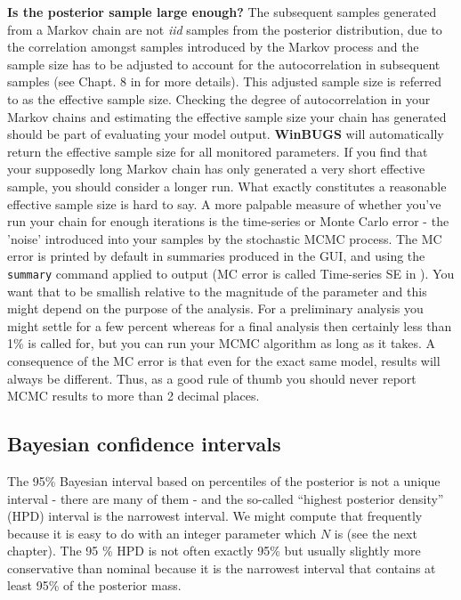 {\bf Is the posterior sample large enough?}  The subsequent samples
generated from a Markov chain are not {\it iid} samples from the
posterior distribution, due to the correlation amongst samples
introduced by the Markov process and the sample size has to be
adjusted to account for the autocorrelation in subsequent samples (see
Chapt. 8 in \citet{robert_casella:2010} for more details). This
adjusted sample size is referred to as the effective sample
size. Checking the degree of autocorrelation in your Markov chains and
estimating the effective sample size your chain has generated should
be part of evaluating your model output. {\bf WinBUGS} will
automatically return the effective sample size for all monitored
parameters. If you find that your supposedly long Markov chain has
only generated a very short effective sample, you should consider a
longer run. What exactly constitutes a reasonable effective sample
size is hard to say. A more palpable measure of whether you've run
your chain for enough iterations is the time-series or Monte Carlo
error - the 'noise' introduced into your samples by the stochastic
MCMC process. The MC error  is printed by
default in summaries produced in the \winbugs GUI, and using the
\mbox{\tt summary} command applied to \jags output (MC error is called
Time-series SE in \jags). You want that to be
smallish relative to the magnitude of the parameter and this might
depend on the purpose of the analysis. For a preliminary analysis you
might settle for a few percent whereas for a final analysis then
certainly less than 1\% is called for, but you can run your MCMC
algorithm as long as it takes. A consequence of the MC error is that
even for the exact same model, results will always be different. Thus,
as a good rule of thumb you should never report MCMC results to more
than 2 decimal places.

\subsection{Bayesian confidence intervals}

The 95\% Bayesian interval based on percentiles of the posterior
is not a unique interval - there are many of them - and the so-called
``highest posterior density'' (HPD) interval is the narrowest
interval. We might compute that frequently because it is easy to do
with an integer parameter which $N$ is (see the next chapter). The
95 \% HPD is not often exactly 95\% but usually slightly more
conservative than nominal because it is the narrowest interval that
contains at least 95\%  of the posterior mass.

